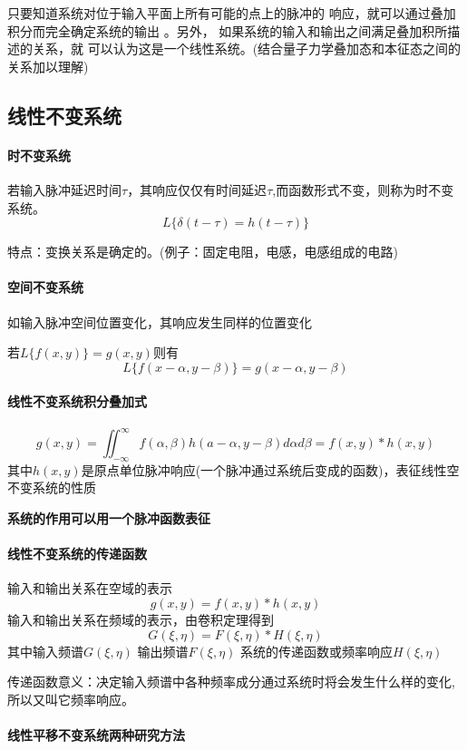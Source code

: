 \documentclass[UTF8]{ctexart}
\begin{document}
只要知道系统对位于输入平面上所有可能的点上的脉冲的
响应，就可以通过叠加积分而完全确定系统的输出 。另外，
如果系统的输入和输出之间满足叠加积所描述的关系，就
可以认为这是一个线性系统。(结合量子力学叠加态和本征态之间的关系加以理解)
\subsection{线性不变系统}
\paragraph{时不变系统}若输入脉冲延迟时间$\tau$，其响应仅仅有时间延迟$\tau$,而函数形式不变，则称为时不变系统。
\[
    L\{\delta(t-\tau)=h(t-\tau)
        \}\]

        特点：变换关系是确定的。(例子：固定电阻，电感，电感组成的电路)

\paragraph{空间不变系统}
如输入脉冲空间位置变化，其响应发生同样的位置变化

若$L\{f(x,y)\}=g(x,y)$则有
\[L\{f(x-\alpha,y-\beta)\}
=g(x-\alpha,y-\beta)
    \]
    \paragraph{线性不变系统积分叠加式}\[
        g(x,y)=\iint_{-\infty}^{\infty}f(\alpha,\beta)h(a-\alpha,y-\beta)d\alpha d\beta
        =f(x,y)*h(x,y)
        \]
        其中$h(x,y)$是原点单位脉冲响应(一个脉冲通过系统后变成的函数)，表征线性空不变系统的性质

        \textbf{系统的作用可以用一个脉冲函数表征}
\paragraph{线性不变系统的传递函数}输入和输出关系在空域的表示
\[
    g(x,y)=f(x,y)*h(x,y)
    \]
    输入和输出关系在频域的表示，由卷积定理得到
    \[
        G(\xi,\eta)=F(\xi,\eta)*H(\xi,\eta)
    \]
其中输入频谱$G(\xi,\eta)$
    输出频谱$F(\xi,\eta)$
    系统的传递函数或频率响应$H(\xi,\eta)$
    
    传递函数意义：决定输入频谱中各种频率成分通过系统时将会发生什么样的变化,所以又叫它频率响应。
    
\paragraph{线性平移不变系统两种研究方法}
\end{document}
